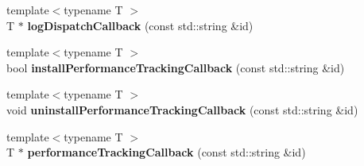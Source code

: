 \begin{DoxyCompactItemize}
\item 
\hypertarget{classel_1_1base_1_1Storage_a408d2420169a7f7286552fd153967b8d}{{\footnotesize template$<$typename T $>$ }\\T $\ast$ {\bfseries log\-Dispatch\-Callback} (const std\-::string \&id)}\label{classel_1_1base_1_1Storage_a408d2420169a7f7286552fd153967b8d}

\item 
\hypertarget{classel_1_1base_1_1Storage_ad95b77123066f0a49817155dd75583b5}{{\footnotesize template$<$typename T $>$ }\\bool {\bfseries install\-Performance\-Tracking\-Callback} (const std\-::string \&id)}\label{classel_1_1base_1_1Storage_ad95b77123066f0a49817155dd75583b5}

\item 
\hypertarget{classel_1_1base_1_1Storage_a0e69baf4bf3140fb7bc88bb386d933cf}{{\footnotesize template$<$typename T $>$ }\\void {\bfseries uninstall\-Performance\-Tracking\-Callback} (const std\-::string \&id)}\label{classel_1_1base_1_1Storage_a0e69baf4bf3140fb7bc88bb386d933cf}

\item 
\hypertarget{classel_1_1base_1_1Storage_aa511779589370416030d9fc1149a32fd}{{\footnotesize template$<$typename T $>$ }\\T $\ast$ {\bfseries performance\-Tracking\-Callback} (const std\-::string \&id)}\label{classel_1_1base_1_1Storage_aa511779589370416030d9fc1149a32fd}

\end{DoxyCompactItemize}
